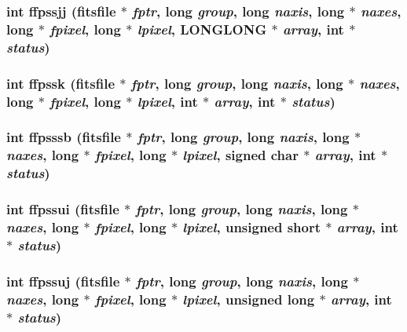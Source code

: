 \subsubsection{\setlength{\rightskip}{0pt plus 5cm}int ffpssjj (\bf{fitsfile} $\ast$ {\em fptr}, long {\em group}, long {\em naxis}, long $\ast$ {\em naxes}, long $\ast$ {\em fpixel}, long $\ast$ {\em lpixel}, \bf{LONGLONG} $\ast$ {\em array}, int $\ast$ {\em status})}\label{fitsio_8h_f77af8b17c852fc01b279669bc4d1331}


\subsubsection{\setlength{\rightskip}{0pt plus 5cm}int ffpssk (\bf{fitsfile} $\ast$ {\em fptr}, long {\em group}, long {\em naxis}, long $\ast$ {\em naxes}, long $\ast$ {\em fpixel}, long $\ast$ {\em lpixel}, int $\ast$ {\em array}, int $\ast$ {\em status})}\label{fitsio_8h_07580d14729935ae3509602b651e7449}


\subsubsection{\setlength{\rightskip}{0pt plus 5cm}int ffpsssb (\bf{fitsfile} $\ast$ {\em fptr}, long {\em group}, long {\em naxis}, long $\ast$ {\em naxes}, long $\ast$ {\em fpixel}, long $\ast$ {\em lpixel}, signed char $\ast$ {\em array}, int $\ast$ {\em status})}\label{fitsio_8h_169a2bd7cc6b4306fac13a357df4dcf0}


\subsubsection{\setlength{\rightskip}{0pt plus 5cm}int ffpssui (\bf{fitsfile} $\ast$ {\em fptr}, long {\em group}, long {\em naxis}, long $\ast$ {\em naxes}, long $\ast$ {\em fpixel}, long $\ast$ {\em lpixel}, unsigned short $\ast$ {\em array}, int $\ast$ {\em status})}\label{fitsio_8h_f72bb4b9e6bf54650b3442d4fe08e50a}


\subsubsection{\setlength{\rightskip}{0pt plus 5cm}int ffpssuj (\bf{fitsfile} $\ast$ {\em fptr}, long {\em group}, long {\em naxis}, long $\ast$ {\em naxes}, long $\ast$ {\em fpixel}, long $\ast$ {\em lpixel}, unsigned long $\ast$ {\em array}, int $\ast$ {\em status})}\label{fitsio_8h_59750e86feb6356e01a6ce684dad31d1}


